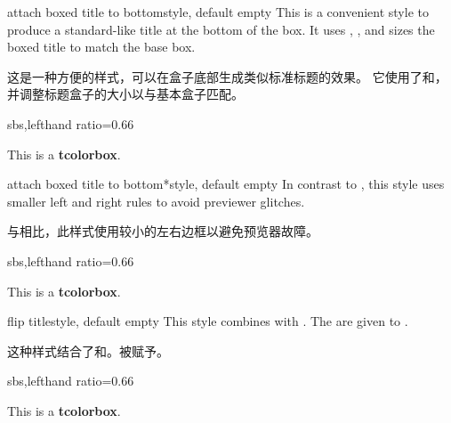 \begin{docTcbKey}[][doc new=2016-02-26]{attach boxed title to bottom}{}{style, default empty}
  This is a convenient style to produce a standard-like title at the bottom
  of the box.
  It uses ,
  , and sizes the boxed title to match
  the base box.

这是一种方便的样式，可以在盒子底部生成类似标准标题的效果。 它使用了和，并调整标题盒子的大小以与基本盒子匹配。
\begin{dispExample*}{sbs,lefthand ratio=0.66}
\begin{tcolorbox}[enhanced,title=My title,
  attach boxed title to bottom,
  boxed title style={colframe=red}]
  This is a \textbf{tcolorbox}.
\end{tcolorbox}
\end{dispExample*}
\end{docTcbKey}

\begin{docTcbKey}[][doc new=2016-02-26]{attach boxed title to bottom*}{}{style, default empty}
  In contrast to , this style
  uses smaller left and right rules to avoid previewer glitches.

与相比，此样式使用较小的左右边框以避免预览器故障。
\begin{dispExample*}{sbs,lefthand ratio=0.66}
\begin{tcolorbox}[enhanced,title=My title,
  attach boxed title to bottom*]
  This is a \textbf{tcolorbox}.
\end{tcolorbox}
\end{dispExample*}
\end{docTcbKey}

\begin{docTcbKey}[][doc new=2016-02-26]{flip title}{}{style, default empty}
  This style combines 
  with . The  are given to
  .

这种样式结合了和。被赋予。
\begin{dispExample*}{sbs,lefthand ratio=0.66}
\begin{tcolorbox}[tile,flip title={sharp corners},
  title=My title,colback=red!10,
  colbacktitle=red!75!black]
  This is a \textbf{tcolorbox}.
\end{tcolorbox}
\end{dispExample*}
\end{docTcbKey}
